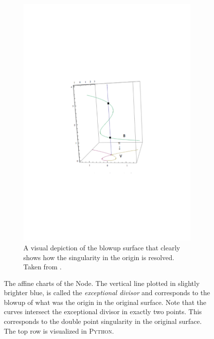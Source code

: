 \documentclass{article}
\begin{document}
\begin{example}
\begin{figure}[h!]
\begin{subfigure}[t]{0.3\textwidth}
            \end{subfigure} \\
            \begin{subfigure}[t]{0.3\textwidth}
                \includegraphics[width=1.0\textwidth]{pictures/blow_up_intuitive.pdf}
                \caption{A visual depiction of the blowup surface that clearly
                    shows how the singularity in the origin is resolved. Taken
                from \cite{Whi08}.}
                \label{fig:blow_up_intuitive}
            \end{subfigure}
            \caption{The affine charts of the Node. The vertical line plotted
                in slightly brighter blue, is called the \emph{exceptional
                divisor} and corresponds to the
                blowup of what was the origin in the original surface. Note
                that the curves intersect the exceptional divisor in exactly two
                points. This corresponds to the double point singularity in the
                original surface. The top row is visualized in \textsc{Python}.}
            \label{fig:affine_charts_node}
        \end{figure}
    \end{example}
    
\end{document}
